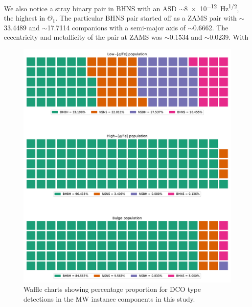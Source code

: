 \documentclass[journal, twocolumns]{IEEEtran}
\begin{document}
%    

	We also notice a stray binary pair in BHNS with an ASD $\sim$\SI{8e-12}{\hertz\tothe{1/2}}, the highest in $\Theta_1$. The particular BHNS pair started off as a ZAMS pair with $\sim$\SI{33.4489}{\Msun} and $\sim$\SI{17.7114}{\Msun} companions with a semi-major axis of $\sim$\SI{0.6662}{\AU}. The eccentricity and metallicity of the pair at ZAMS was $\sim$\num{0.1534} and $\sim$\num{0.0239}. With

    \begin{figure}[!h]%
		\centering
		\includegraphics[width=\columnwidth]{analysis_data/main_analysis_folder/dco_type_MW_component_distribution_cropped}
		\caption{Waffle charts showing percentage proportion for DCO type detections in the MW instance components in this study.}
		\label{fig:dcotypemwcomponentdistributioncropped}
	\end{figure}%
\end{document}
